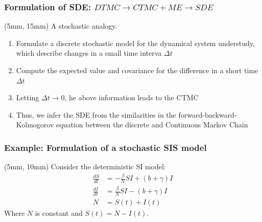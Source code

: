 \begin{frame}
    \frametitle{Formulation of SDE: $DTMC \to CTMC + ME \to SDE$}
%
        \begin{textblock*}{60mm}(5mm, 15mm)
            A stochastic analogy.
            \begin{enumerate}[label=(\roman*)]
                \item<2->
                    Formulate a discrete stochastic
                    model for the dynamical system
                    understudy, which describe changes
                    in a small time interva $\Delta t$
                \item<3->
                    Compute the expected value and
                    covariance for the difference in a short
                    time $\Delta t$
                \item<4->
                    Letting $\Delta t \to 0$, 
                    he above information
                    leads to the CTMC
                \item<5->
                    Thus, we infer the SDE from the
                    similarities in the forward-backward-Kolmogorov equation 
                    between the
                    discrete and Continuous Markov
                    Chain
            \end{enumerate}
        \end{textblock*}
\end{frame}
\begin{frame}%
    \frametitle{Example: Formulation of a stochastic SIS model}
    \begin{textblock*}{50mm}(5mm, 10mm)
    Consider the deterministic SI model:
        \begin{align*}
            \frac{dS}{dt} &= -\frac{\beta}{N} S I + (b +\gamma) I
                \\
            \frac{dI}{dt} &= \frac{\beta}{N} S I - (b +\gamma) I
                \\
            N &= S(t)+ I(t)
        \end{align*}
        Where $N$ is constant and  $S(t) = N - I(t)$.
    \end{textblock*}
\end{frame}
